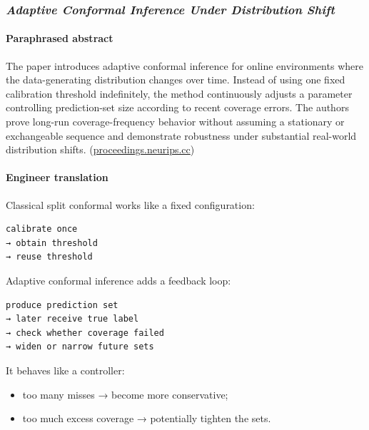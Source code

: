 \subsubsection{\texorpdfstring{\emph{Adaptive Conformal Inference Under Distribution Shift}}{Adaptive Conformal Inference Under Distribution Shift}}\label{adaptive-conformal-inference-under-distribution-shift}

\paragraph{Paraphrased abstract}\label{paraphrased-abstract-3}

The paper introduces adaptive conformal inference for online environments where the data-generating distribution changes over time. Instead of using one fixed calibration threshold indefinitely, the method continuously adjusts a parameter controlling prediction-set size according to recent coverage errors. The authors prove long-run coverage-frequency behavior without assuming a stationary or exchangeable sequence and demonstrate robustness under substantial real-world distribution shifts. (\href{https://proceedings.neurips.cc/paper/2021/hash/0d441de75945e5acbc865406fc9a2559-Abstract.html}{proceedings.neurips.cc})

\paragraph{Engineer translation}\label{engineer-translation-3}

Classical split conformal works like a fixed configuration:

\begin{lstlisting}
calibrate once
→ obtain threshold
→ reuse threshold
\end{lstlisting}

Adaptive conformal inference adds a feedback loop:

\begin{lstlisting}
produce prediction set
→ later receive true label
→ check whether coverage failed
→ widen or narrow future sets
\end{lstlisting}

It behaves like a controller:

\begin{itemize}
\tightlist
\item
  too many misses → become more conservative;
\item
  too much excess coverage → potentially tighten the sets.
\end{itemize}

